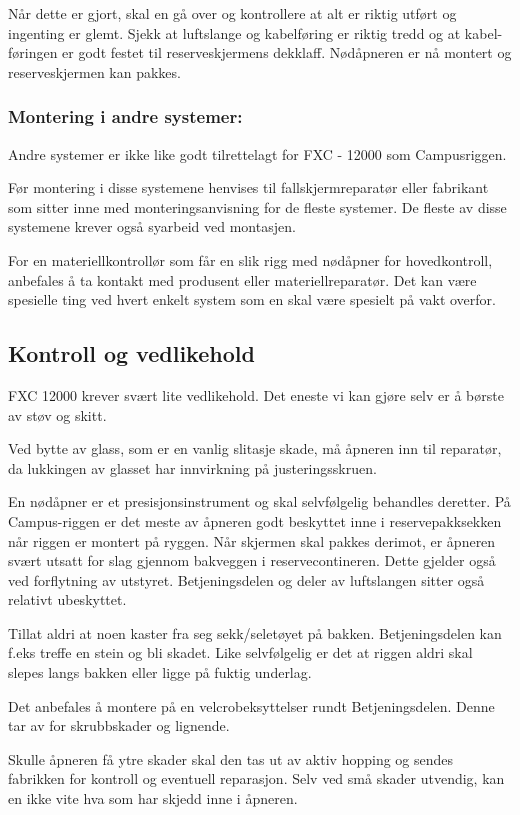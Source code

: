 Når dette er gjort, skal en gå over og kontrollere at alt er riktig utført og ingenting er glemt. Sjekk at luftslange og kabelføring er riktig tredd og at kabel-føringen er godt festet til reserveskjermens dekklaff. Nødåpneren er nå montert og reserveskjermen kan pakkes.

\subsubsection{Montering i andre systemer:}
Andre systemer er ikke like godt tilrettelagt for FXC - 12000 som Campusriggen.

Før montering i disse systemene henvises til fallskjermreparatør eller fabrikant som sitter inne med monteringsanvisning for de fleste systemer. De fleste av disse systemene krever også syarbeid ved montasjen.

For en materiellkontrollør som får en slik rigg med nødåpner for hovedkontroll, anbefales å ta kontakt med produsent eller materiellreparatør. Det kan være spesielle ting ved hvert enkelt system som en skal være spesielt på vakt overfor.

\subsection{Kontroll og vedlikehold}
FXC 12000 krever svært lite vedlikehold. Det eneste vi kan gjøre selv er å børste av støv og skitt.

Ved bytte av glass, som er en vanlig slitasje skade, må åpneren inn til reparatør, da lukkingen av glasset har innvirkning på justeringsskruen.

En nødåpner er et presisjonsinstrument og skal selvfølgelig behandles deretter. På Campus-riggen er det meste av åpneren godt beskyttet inne i reservepakksekken når riggen er montert på ryggen. Når skjermen skal pakkes derimot, er åpneren svært utsatt for slag gjennom bakveggen i reservecontineren. Dette gjelder også ved forflytning av utstyret. Betjeningsdelen og deler av luftslangen sitter også relativt ubeskyttet.

Tillat aldri at noen kaster fra seg sekk/seletøyet på bakken. Betjeningsdelen kan f.eks treffe en stein og bli skadet. Like selvfølgelig er det at riggen aldri skal slepes langs bakken eller ligge på fuktig underlag.

Det anbefales å montere på en velcrobeksyttelser rundt Betjeningsdelen. Denne tar av for skrubbskader og lignende.

Skulle åpneren få ytre skader skal den tas ut av aktiv hopping og sendes fabrikken for kontroll og eventuell reparasjon. Selv ved små skader utvendig, kan en ikke vite hva som har skjedd inne i åpneren.

